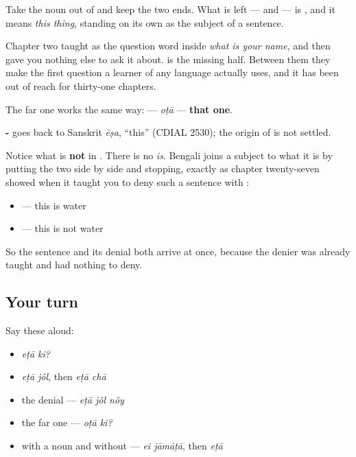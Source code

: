 Take the noun out of \textbf{ } and keep the two ends. What is left — \textbf{} and \textbf{} — is \textbf{}, and it means \emph{this thing}, standing on its own as the subject of a sentence.

Chapter two taught \textbf{} as the question word inside \emph{what is your name}, and then gave you nothing else to ask it about. \textbf{} is the missing half. Between them they make the first question a learner of any language actually uses, and it has been out of reach for thirty-one chapters.

The far one works the same way: \textbf{} — \emph{oṭā} — \textbf{that one}.

\begin{cousinweb}
\textbf{-} goes back to Sanskrit \emph{ēṣa}, \textquotedblleft{}this\textquotedblright{} (CDIAL 2530); the origin of \textbf{} is not settled.
\end{cousinweb}

\begin{grammarlens}[title={Grammar Lens: no verb in the middle}]
Notice what is \textbf{not} in \textbf{ }. There is no \emph{is}. Bengali joins a subject to what it is by putting the two side by side and stopping, exactly as chapter twenty-seven showed when it taught you to deny such a sentence with \textbf{}:

\begin{itemize}
\raggedright
  \item \textbf{ } — this is water
  \item \textbf{  } — this is not water
\end{itemize}

So the sentence and its denial both arrive at once, because the denier was already taught and had nothing to deny.
\end{grammarlens}

\subsection*{Your turn}
Say these aloud:

\begin{itemize}
\raggedright
  \item \emph{eṭā ki?}
  \item \emph{eṭā jôl}, then \emph{eṭā chā}
  \item the denial — \emph{eṭā jôl nôy}
  \item the far one — \emph{oṭā ki?}
  \item with a noun and without — \emph{ei jāmāṭā}, then \emph{eṭā}
\end{itemize}

